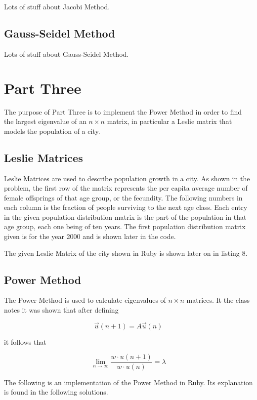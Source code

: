 \documentclass[letterpaper,12pt]{article}
\begin{document}
Lots of stuff about Jacobi Method.

\subsection{Gauss-Seidel Method}

Lots of stuff about Gauss-Seidel Method.

\newpage
\section{Part Three}


The purpose of Part Three is to implement the Power Method in order to find the
largest eigenvalue of an $n \times n$ matrix, in particular a Leslie matrix that
models the population of a city.

\subsection{Leslie Matrices}

Leslie Matrices are used to describe population growth in a city.
As shown in the problem, the first row of the matrix represents the per capita
average number of female offsprings of that age group, or the fecundity.
The following numbers in each column is the fraction of people surviving to the
next age class.
Each entry in the given population distribution matrix is the part of the
population in that age group, each one being of ten years.
The first population distribution matrix given is for the year 2000 and is shown
later in the code.

The given Leslie Matrix of the city shown in Ruby is shown later on in listing 8.

\subsection{Power Method}

The Power Method is used to calculate eigenvalues of $n \times n$ matrices.
It the class notes it was shown that after defining 

\[\vec{u}(n+1) = A\vec{u}(n)\]

it follows that

\[\lim_{n\to\infty} \frac{{w} \cdot {u(n+1)}}{ {w} \cdot {u(n)}} =\lambda\]

The following is an implementation of the Power Method in Ruby.
Its explanation is found in the following solutions.
\end{document}

